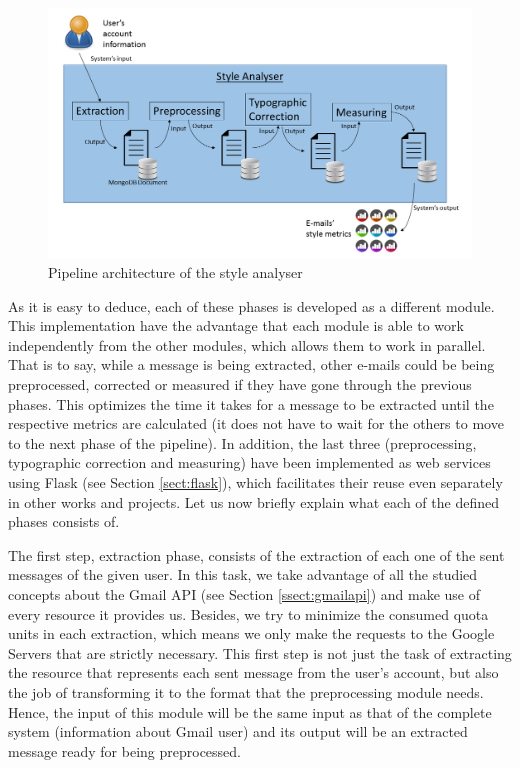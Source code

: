 \begin{figure}[h]
	\centering%
	\centerline{\includegraphics[width = 1\textwidth]{Imagenes/Bitmap/Analyser/architecture.png}}%
	\caption{Pipeline architecture of the style analyser}%
	\label{fig:arch}
\end{figure}

As it is easy to deduce, each of these phases is developed as a different module. This implementation have the advantage that each module is able to work independently from the other modules, which allows them to work in parallel. That is to say, while a message is being extracted, other e-mails could be being preprocessed, corrected or measured if they have gone through the previous phases. This optimizes the time it takes for a message to be extracted until the respective metrics are calculated (it does not have to wait for the others to move to the next phase of the pipeline). In addition, the last three (preprocessing, typographic correction and measuring) have been implemented as web services using Flask (see Section \ref{sect:flask}), which facilitates their reuse even separately in other works and projects. Let us now briefly explain what each of the defined phases consists of.

The first step, extraction phase, consists of the extraction of each one of the sent messages of the given user. In this task, we take advantage of all the studied concepts about the Gmail API (see Section \ref{ssect:gmailapi}) and make use of every resource it provides us. Besides, we try to minimize the consumed quota units in each extraction, which means we only make the requests to the Google Servers that are strictly necessary. This first step is not just the task of extracting the resource that represents each sent message from the user's account, but also the job of transforming it to the format that the preprocessing module needs. Hence, the input of this module will be the same input as that of the complete system (information about Gmail user) and its output will be an extracted message ready for being preprocessed.

